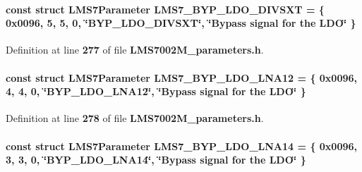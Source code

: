 \paragraph[{L\+M\+S7\+\_\+\+B\+Y\+P\+\_\+\+L\+D\+O\+\_\+\+D\+I\+V\+S\+XT}]{\setlength{\rightskip}{0pt plus 5cm}const struct {\bf L\+M\+S7\+Parameter} L\+M\+S7\+\_\+\+B\+Y\+P\+\_\+\+L\+D\+O\+\_\+\+D\+I\+V\+S\+XT = \{ 0x0096, 5, 5, 0, \char`\"{}\+B\+Y\+P\+\_\+\+L\+D\+O\+\_\+\+D\+I\+V\+S\+X\+T\char`\"{}, \char`\"{}\+Bypass signal for the L\+D\+O\char`\"{} \}\hspace{0.3cm}{\ttfamily [static]}}\label{LMS7002M__parameters_8h_a295e718d913395d03d29a75f7848a956}


Definition at line {\bf 277} of file {\bf L\+M\+S7002\+M\+\_\+parameters.\+h}.

\paragraph[{L\+M\+S7\+\_\+\+B\+Y\+P\+\_\+\+L\+D\+O\+\_\+\+L\+N\+A12}]{\setlength{\rightskip}{0pt plus 5cm}const struct {\bf L\+M\+S7\+Parameter} L\+M\+S7\+\_\+\+B\+Y\+P\+\_\+\+L\+D\+O\+\_\+\+L\+N\+A12 = \{ 0x0096, 4, 4, 0, \char`\"{}\+B\+Y\+P\+\_\+\+L\+D\+O\+\_\+\+L\+N\+A12\char`\"{}, \char`\"{}\+Bypass signal for the L\+D\+O\char`\"{} \}\hspace{0.3cm}{\ttfamily [static]}}\label{LMS7002M__parameters_8h_ae3678d074c4c441547d38f4946004034}


Definition at line {\bf 278} of file {\bf L\+M\+S7002\+M\+\_\+parameters.\+h}.

\paragraph[{L\+M\+S7\+\_\+\+B\+Y\+P\+\_\+\+L\+D\+O\+\_\+\+L\+N\+A14}]{\setlength{\rightskip}{0pt plus 5cm}const struct {\bf L\+M\+S7\+Parameter} L\+M\+S7\+\_\+\+B\+Y\+P\+\_\+\+L\+D\+O\+\_\+\+L\+N\+A14 = \{ 0x0096, 3, 3, 0, \char`\"{}\+B\+Y\+P\+\_\+\+L\+D\+O\+\_\+\+L\+N\+A14\char`\"{}, \char`\"{}\+Bypass signal for the L\+D\+O\char`\"{} \}\hspace{0.3cm}{\ttfamily [static]}}\label{LMS7002M__parameters_8h_afc0eb5bf5c5487ed82bf4334e9b2029b}


